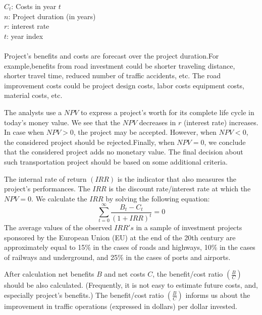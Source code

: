 \hspace*{10mm}$C_t$: Costs in year $t$\\
\hspace*{10mm}$n$: Project duration (in years)\\
\hspace*{10mm}$r$: interest rate\\
\hspace*{10mm}$t$: year index\\\\
%
Project’s benefits and costs are forecast over the project duration.For example,benefits from road investment could be shorter traveling distance, shorter travel time, reduced number of traffic accidents, etc. The road improvement costs could be project design costs, labor costs equipment costs, material costs, etc.\\
\par
The analysts use a $NPV$ to express a project’s worth for its complete life cycle in today’s money value. We see that the $NPV$ decreases in $r$ (interest rate) increases. In case when $NPV > 0$, the project may be accepted. However, when $NPV < 0$, the considered project should be rejected.Finally, when $NPV = 0$, we conclude that the considered project adds no monetary value. The final decision about such transportation project should be based on some additional criteria.\\
\par
The internal rate of return $(IRR)$ is the indicator that also measures the project’s performances. The $IRR$ is the discount rate/interest rate at which the $NPV = 0$. We calculate the $IRR$ by solving the following equation:
\begin{equation}
	\sum_{t = 0}^{\infty} \frac{B_t - C_t}{(1 + IRR)^t} = 0
\end{equation}
%
The average values of the observed $IRR's$ in a sample of investment projects sponsored by the European Union (EU) at the end of the 20th century are approximately equal to 15\% in the cases of roads and highways, 10\% in the cases of railways and underground, and 25\% in the cases of ports and airports.\\
\par
After calculation net benefits $B$ and net costs $C$, the benefit/cost ratio $\left( \frac{B}{C} \right)$ should be also calculated. (Frequently, it is not easy to estimate future costs, and, especially project’s benefits.) The benefit/cost ratio $\left( \frac{B}{C} \right)$ informs us about the improvement in traffic operations (expressed in dollars) per dollar invested.\\

